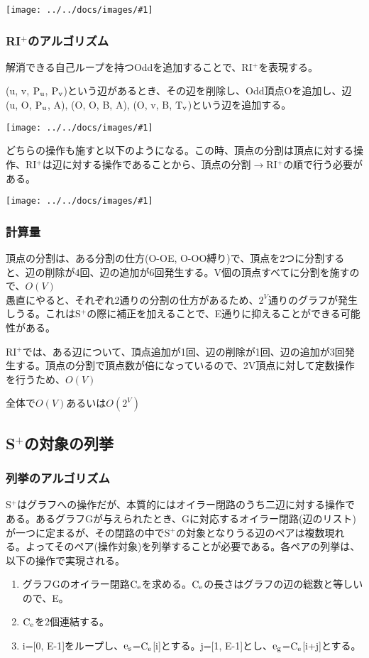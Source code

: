 \documentclass[11pt,a4j]{jarticle}
\newcommand{\splus}{S${}^\text{+}$}
\newcommand{\riplus}{RI${}^\text{+}$}
\newcommand{\fl}[1]{$\rm{#1}$}
\newcommand{\image}[1]{\begin{center}\texttt{[image: ../../docs/images/\#1]}\end{center}}
\newcommand{\ra }{$\rightarrow$}
\begin{document}
\image{extend_split.jpg}

\subsubsection{\riplus のアルゴリズム}
解消できる自己ループを持つOddを追加することで、\riplus を表現する。

(u, v, \fl{P_u}, \fl{P_v})という辺があるとき、その辺を削除し、Odd頂点Oを追加し、辺(u, O, \fl{P_u}, A), (O, O, B, A), (O, v, B, \fl{T_v})という辺を追加する。

\image{extend_riplus.jpg}

どちらの操作も施すと以下のようになる。この時、頂点の分割は頂点に対する操作、\riplus は辺に対する操作であることから、頂点の分割\ra \riplus の順で行う必要がある。
\image{extend_total.jpg}

\subsubsection{計算量}
頂点の分割は、ある分割の仕方(O-OE, O-OO縛り)で、頂点を2つに分割すると、辺の削除が4回、辺の追加が6回発生する。V個の頂点すべてに分割を施すので、$O(V)$\\
愚直にやると、それぞれ2通りの分割の仕方があるため、$2^V$通りのグラフが発生しうる。これは\splus の際に補正を加えることで、E通りに抑えることができる可能性がある。

\riplus では、ある辺について、頂点追加が1回、辺の削除が1回、辺の追加が3回発生する。頂点の分割で頂点数が倍になっているので、2V頂点に対して定数操作を行うため、$O(V)$

全体で$O(V)$あるいは$O(2^V)$

\subsection{\splus の対象の列挙}
\label{enum}
\subsubsection{列挙のアルゴリズム}
\splus はグラフへの操作だが、本質的にはオイラー閉路のうち二辺に対する操作である。あるグラフGが与えられたとき、Gに対応するオイラー閉路(辺のリスト)が一つに定まるが、その閉路の中で\splus の対象となりうる辺のペアは複数現れる。よってそのペア(操作対象)を列挙することが必要である。各ペアの列挙は、以下の操作で実現される。

\begin{enumerate}
    \item グラフGのオイラー閉路\fl{C_e}を求める。\fl{C_e}の長さはグラフの辺の総数と等しいので、E。
    \item \fl{C_e}を2個連結する。
    \item i=[0, E-1]をループし、\fl{e_s}=\fl{C_e}[i]とする。j=[1, E-1]とし、\fl{e_g}=\fl{C_e}[i+j]とする。
\end{enumerate}
\end{document}
